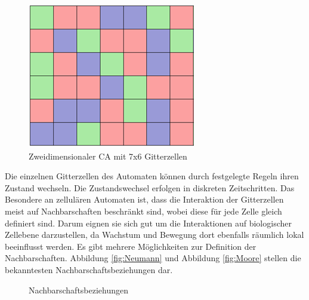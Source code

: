 \documentclass[11pt,a4paper,pointlessnumbers]{scrreprt}  %
\begin{document}
\begin{figure}[!ht]
	\centering
	\includegraphics{Zustandsfaerbung}
	\caption{Zweidimensionaler CA mit 7x6 Gitterzellen \cite{Scholz2014}}
	\label{fig:Zustand}
\end{figure}

Die einzelnen Gitterzellen des Automaten können durch festgelegte Regeln ihren Zustand wechseln. Die Zustandswechsel erfolgen in diskreten Zeitschritten. Das Besondere an zellulären Automaten ist, dass die Interaktion der Gitterzellen meist auf Nachbarschaften beschränkt sind, wobei diese für jede Zelle gleich definiert sind. Darum eignen sie sich gut um die Interaktionen auf biologischer Zellebene darzustellen, da Wachstum und Bewegung dort ebenfalls räumlich lokal beeinflusst werden. Es gibt mehrere Möglichkeiten zur Definition der Nachbarschaften. Abbildung \ref{fig:Neumann} und Abbildung \ref{fig:Moore} stellen die bekanntesten Nachbarschaftsbeziehungen dar.\newpage

\begin{figure}[!ht]
	\vspace{2cm}
	\caption{Nachbarschaftsbeziehungen \cite{Scholz2014}} 
	\label{fig:Nachbarschaftsbeziehungen}
\end{figure} 
\end{document}
